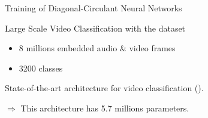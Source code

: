 \begin{frame}{Training of Diagonal-Circulant Neural Networks}

  \begin{block}{Large Scale Video Classification with the \yt dataset}
    \begin{itemize}
      \item 8 millions embedded audio \& video frames
      \item 3200 classes
    \end{itemize}
  \end{block}

  State-of-the-art architecture for video classification ({}).
  \begin{figure}[htb]
    \scalebox{0.65}{}
  \end{figure}
  $\Rightarrow$ This architecture has 5.7 millions parameters.

\end{frame}


